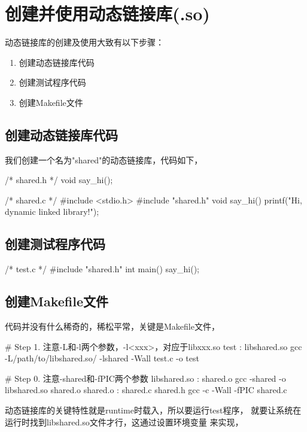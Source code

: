 \section[Shared library(.so)]{创建并使用动态链接库(.so)}
动态链接库的创建及使用大致有以下步骤：
\begin{enumerate}
  \item 创建动态链接库代码
  \item 创建测试程序代码
  \item 创建Makefile文件
\end{enumerate}

\subsection[code for .so file]{创建动态链接库代码}
我们创建一个名为"shared"的动态链接库，代码如下，

\begin{cppcode}
/* shared.h */
void say_hi();

/* shared.c */
#include <stdio.h>
#include "shared.h"
void say_hi() {
  printf("Hi, dynamic linked library!\n");
}
\end{cppcode}

\subsection[code for test program]{创建测试程序代码}
\begin{cppcode}
/* test.c */
#include "shared.h"
int main()
{
  say_hi();
}
\end{cppcode}

\subsection[create Makefile]{创建Makefile文件}
代码并没有什么稀奇的，稀松平常，关键是Makefile文件，

\begin{makecode}
# Step 1. 注意-L和-l两个参数，-l<xxx>，对应于libxxx.so
test : libshared.so
  gcc -L/path/to/libshared.so/ -lshared -Wall test.c -o test

# Step 0. 注意-shared和-fPIC两个参数
libshared.so : shared.o
  gcc -shared -o libshared.so shared.o
shared.o : shared.c shared.h
  gcc -c -Wall -fPIC shared.c
\end{makecode}

动态链接库的关键特性就是runtime时载入，所以要运行test程序，
就要让系统在运行时找到libshared.so文件才行，这通过设置环境变量
来实现，

